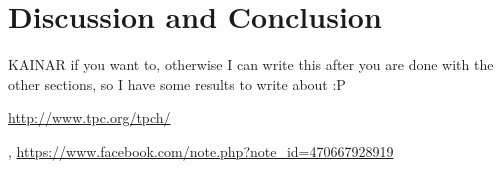 \documentclass[11 pt ]{article}
\begin{document}
\section{Discussion and Conclusion}
KAINAR if you want to, otherwise I can write this after you are done with the other sections, so I have some results to write about :P


\begin{thebibliography}{77}
\url{http://www.tpc.org/tpch/}

\author{Liyin Tang},
\url{https://www.facebook.com/note.php?note_id=470667928919}

\end{thebibliography}


\end{document}
